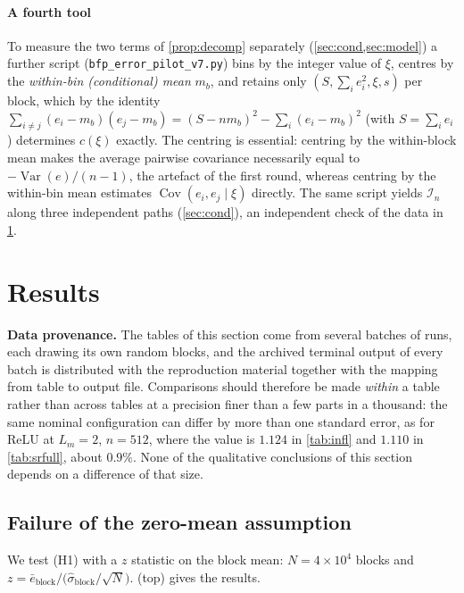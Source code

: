 \documentclass[review,hidelinks,oneeqnum,onetabnum,onefignum,onethmnum]{siamart251216}
\begin{document}
\paragraph{A fourth tool} To measure the two terms of \cref{prop:decomp} separately
(\cref{sec:cond,sec:model}) a further script
(\texttt{bfp\_error\_pilot\_v7.py}) bins by the integer value of $\xi$, centres by
the \emph{within-bin (conditional) mean} $m_b$, and retains only
$(S,\sum_i e_i^2,\xi,s)$ per block, which by the identity
$\sum_{i\ne j}(e_i-m_b)(e_j-m_b)=(S-nm_b)^2-\sum_i(e_i-m_b)^2$ (with
$S=\sum_i e_i$) determines $c(\xi)$ exactly. The centring is essential: centring
by the within-block mean makes the average pairwise covariance necessarily equal to
$-\operatorname{Var}(e)/(n-1)$, the artefact of the first round, whereas centring
by the within-bin mean estimates $\operatorname{Cov}(e_i,e_j\mid\xi)$ directly. The
same script yields $\mathcal I_n$ along three independent paths (\cref{sec:cond}),
an independent check of the data in \cref{sec:results}.

\section{Results}
\label{sec:results}

\noindent\textbf{Data provenance.} The tables of this section come from several
batches of runs, each drawing its own random blocks, and the archived terminal
output of every batch is distributed with the reproduction material together with
the mapping from table to output file. Comparisons should therefore be made
\emph{within} a table rather than across tables at a precision finer than a few
parts in a thousand: the same nominal configuration can differ by more than one
standard error, as for ReLU at $L_m=2$, $n=512$, where the value is $1.124$ in
\cref{tab:infl} and $1.110$ in \cref{tab:srfull}, about $0.9\%$. None of the
qualitative conclusions of this section depends on a difference of that size.

\subsection{Failure of the zero-mean assumption}
\label{sec:bias}

We test (H1) with a $z$ statistic on the block mean: $N=4\times10^4$ blocks and
$z=\bar e_{\text{block}}/\bigl(\hat\sigma_{\text{block}}/\sqrt N\bigr)$.
 (top) gives the results.
\end{document}
